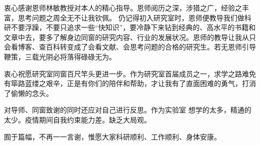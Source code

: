 \begin{acknowledgement}
    衷心感谢恩师林敏教授对本人的精心指导。恩师阅历之深，涉猎之广，经验之丰富，思考问题之周全无不让我钦佩。
    仍记得初入研究室时，恩师便教导我们做科研不要浮躁，不要只追求一些“快知识”，要冷静下来钻到经典的、高水平的书籍和文章中去，要多了解身边同窗的研究内容、行业的发展状况。恩师的教导让我从只会看博客、查百科转变成了会看文献、会思考问题的合格的研究生。若无恩师引导鞭策，三载光阴必将落得碌碌无为。

    衷心祝愿研究室同窗百尺竿头更进一步。作为研究室首届成员之一，求学之路难免有筚路蓝缕之艰辛，正是有你们的陪伴和帮助，才让我有了直面困难的勇气，打消了偷懒的念头。

    对导师、同窗致谢的同时还应对自己进行反思。作为实验室 想学的太多，精通的太少。疫情期间自我约束能力差。缺乏大局观。

    囿于篇幅，不再一一言谢，惟愿大家科研顺利、工作顺利、身体安康。
\end{acknowledgement}
